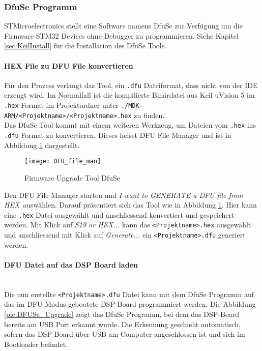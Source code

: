\subsubsection{DfuSe Programm}
\label{sec:DFUSe}

STMicroelectronics stellt eine Software namens DfuSe zur Verfügung um die Firmware STM32 Devices ohne Debugger zu programmieren. Siehe Kapitel \ref{sec:KeilInstall} für die Installation des DfuSe Tools.

\paragraph{HEX File zu DFU File konvertieren}

Für den Prozess verlangt das Tool, ein \texttt{.dfu} Dateiformat, dass nicht von der IDE erzeugt wird. 
Im Normalfall ist die kompilierte Binärdatei aus Keil uVision 5 im \texttt{.hex} Format im Projektordner unter \texttt{./MDK-ARM/<Projektname>/<Projektname>.hex} zu finden.\\

Das DfuSe Tool kommt mit einem weiteren Werkzeug, um Dateien vom \texttt{.hex} ins \texttt{.dfu} Format zu konvertieren. 
Dieses heisst DFU File Manager und ist in Abbildung \ref{pic:DFU_file_man} dargestellt.

\begin{figure}[H]
	\centering
	\texttt{[image: DFU\_file\_man]}
	\caption{Firmware Upgrade Tool DfuSe}
	\label{pic:DFU_file_man}
\end{figure}

Den DFU File Manager starten und \glqq\textit{I want to GENERATE a DFU file from HEX}\grqq \ auswählen.
Darauf präsentiert sich das Tool wie in Abbildung \ref{pic:DFU_file_man}. Hier kann eine \texttt{.hex} Datei ausgewählt und anschliessend konvertiert und gespeichert werden.
Mit Klick auf \textit{\glqq S19 or HEX...\grqq} kann das \texttt{<Projektname>.hex} ausgewählt und anschliessend mit Klick auf \textit{\glqq Generate...\grqq} ein \texttt{<Projektname>.dfu} generiert werden.
\\
\paragraph{DFU Datei auf das DSP Board laden}\vspace{-0.3cm}\\
Die nun erstellte \texttt{<Projektname>.dfu} Datei kann mit dem DfuSe Programm auf das im DFU Modus gebootete DSP-Board programmiert werden. 
Die Abbildung \ref{pic:DFUSe_Upgrade} zeigt das DfuSe Programm, bei dem das DSP-Board bereits am USB Port erkannt wurde. Die Erkennung geschieht automatisch, sofern das DSP-Board über USB am Computer angeschlossen ist und sich im Bootloader befindet.

